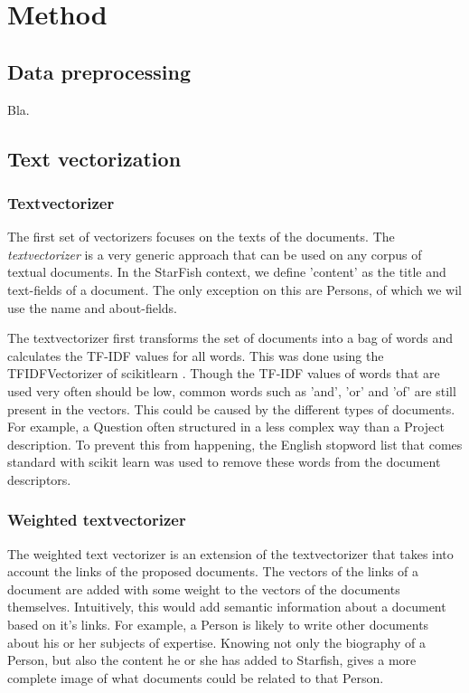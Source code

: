 \section{Method}

\subsection{Data preprocessing}
Bla.

\subsection{Text vectorization}
\subsubsection{Textvectorizer}

The first set of vectorizers focuses on the texts of the documents. The \emph{textvectorizer} is a very generic approach that can be used on any corpus of textual documents. In the StarFish context, we define 'content' as the title and text-fields of a document. The only exception on this are Persons, of which we wil use the name and about-fields. 

The textvectorizer first transforms the set of documents into a bag of words and calculates the TF-IDF values for all words. This was done using the TFIDFVectorizer of scikitlearn \citep{scikit-learn}.  Though the TF-IDF values of words that are used very often should be low, common words such as 'and', 'or' and 'of' are still present in the vectors. This could be caused by the different types of documents. For example, a Question often structured in a less complex way than a Project description. To prevent this from happening, the English stopword list that comes standard with scikit learn was used to remove these words from the document descriptors.

\subsubsection{Weighted textvectorizer}
The weighted text vectorizer is an extension of the textvectorizer that takes into account the links of the proposed documents. The vectors of the links of a document are added with some weight to the vectors of the documents themselves. Intuitively, this would add semantic information about a document based on it's links. For example, a Person is likely to write other documents about his or her subjects of expertise. Knowing not only the biography of a Person, but also the content he or she has added to Starfish, gives a more complete image of what documents could be related to that Person.

